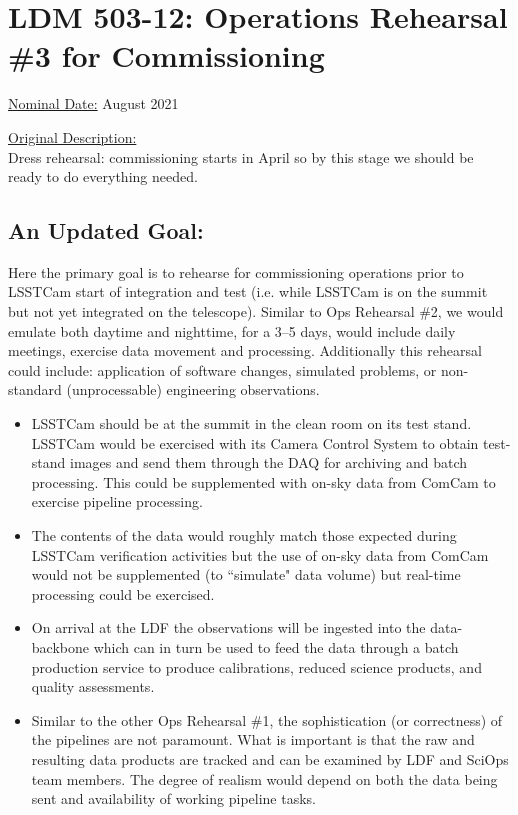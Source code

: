 \clearpage

%
%
%

\section{LDM 503-12: Operations Rehearsal \#3 for Commissioning}

\underline{Nominal Date:} August 2021

\underline{Original Description:}\\
Dress rehearsal: commissioning starts in April so by this stage we should 
be ready to do everything needed.

\subsection{An Updated Goal:}

Here the primary goal is to rehearse for commissioning operations prior to 
LSSTCam start of integration and test (i.e. while LSSTCam is on the summit
but not yet integrated on the telescope).  Similar to Ops Rehearsal \#2, 
we would emulate both daytime and nighttime, 
for a 3--5 days, would include daily meetings, exercise data movement and
processing.  Additionally this rehearsal could include: application of software 
changes, simulated problems, or non-standard (unprocessable) engineering 
observations.  

\begin{itemize}[topsep=-8pt]
\item LSSTCam should be at the summit in the clean room on its test stand.
LSSTCam would be exercised with its Camera Control System to obtain test-stand
images and send them through the DAQ for archiving and batch processing.  This
could be supplemented with on-sky data from ComCam to exercise pipeline 
processing.

\item The contents of the data would roughly match those expected during 
LSSTCam verification activities but the use of on-sky data from ComCam would
not be supplemented (to ``simulate" data volume) but real-time processing
could be exercised.

\item On arrival at the LDF the observations will be ingested into the 
data-backbone which can in turn be used to feed the data through a batch
production service to produce calibrations, reduced science products, and
quality assessments.

\item Similar to the other Ops Rehearsal \#1, the sophistication (or correctness)
of the pipelines are not paramount.  What is important is that the raw and
resulting data products are tracked and can be examined by LDF and
SciOps team members.  The degree of realism would depend on both the data
being sent and availability of working pipeline tasks.
\end{itemize}

\clearpage


